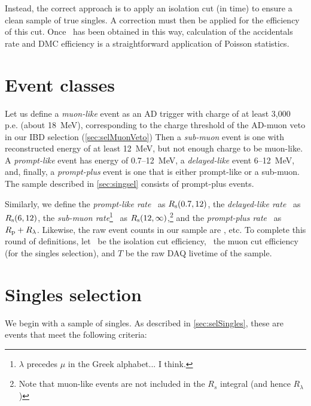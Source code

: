 \documentclass[../thesis.tex]{subfiles}
\begin{document}
Instead, the correct approach is to apply an isolation cut (in time) to ensure a
clean sample of true singles. A correction must then be applied for the
efficiency of this cut. Once \Rs\ has been obtained in this way, calculation of
the accidentals rate and DMC efficiency is a straightforward application of
Poisson statistics.

\section{Event classes}
\label{sec:accdmcevtcls}

Let us define a \emph{muon-like} event as an AD trigger with charge of at least 3,000 p.e. (about 18~MeV), corresponding to the charge threshold of the AD-muon veto in our IBD selection (\autoref{sec:selMuonVeto})
Then a \emph{sub-muon} event is one with reconstructed energy of at least 12~MeV, but not enough charge to be muon-like. A \emph{prompt-like} event has energy of
0.7--12~MeV, a \emph{delayed-like} event 6--12~MeV, and, finally, a
\emph{prompt-plus} event is one that is either prompt-like or a sub-muon. The
sample described in \autoref{sec:singsel} consists of prompt-plus events.

Similarly, we define the \emph{prompt-like rate} \Rpro\ as $R_\mathrm{s}(0.7, 12)$, the
\emph{delayed-like rate} \Rdel\ as $R_\mathrm{s}(6, 12)$, the \emph{sub-muon
  rate}\footnote{$\lambda$ precedes $\mu$ in the Greek alphabet... I think.}
\Rsub\ as $R_\mathrm{s}(12, \infty)$,\footnote{Note that muon-like events are not included in the $R_s$ integral (and hence $R_\lambda$)} and the
\emph{prompt-plus rate} \Rplu\ as $R_\mathrm{p} + R_\mathrm{\lambda}$. Likewise, the raw event
counts in our sample are \Npro, etc. To complete this round of definitions, let
\eisol\ be the isolation cut efficiency, \emu\ the muon cut efficiency (for the
singles selection), and $T$ be the raw DAQ livetime of the sample.

\section{Singles selection}
\label{sec:singsel}

We begin with a sample of singles. As described in \autoref{sec:selSingles}, these are events that meet the following criteria:
\end{document}

